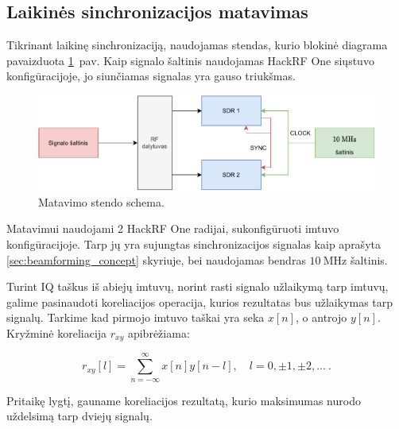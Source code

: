\documentclass[main.tex]{subfiles}
\begin{document}
\subsection{Laikinės sinchronizacijos matavimas}\label{sec:time_sync}

Tikrinant laikinę sinchronizaciją, naudojamas stendas, kurio
blokinė diagrama pavaizduota \ref{fig:measurement_stand}~pav.
Kaip signalo šaltinis naudojamas HackRF One siųstuvo konfigūracijoje,
jo siunčiamas signalas yra gauso triukšmas.

\begin{figure}[h]
    \begin{centering}
    \includegraphics[scale=0.9]{drawings/measurement_stand}
    \par\end{centering}
    \protect\caption{\label{fig:measurement_stand}Matavimo stendo schema.}
\end{figure}

Matavimui naudojami 2 HackRF One radijai, sukonfigūruoti imtuvo konfigūracijoje.
Tarp jų yra sujungtas sinchronizacijos signalas kaip aprašyta \ref{sec:beamforming_concept}
skyriuje, bei naudojamas bendras $10\ \mathrm{MHz}$ šaltinis.

Turint IQ taškus iš abiejų imtuvų, norint rasti signalo užlaikymą tarp imtuvų, galime
pasinaudoti koreliacijos operacija, kurios rezultatas bus užlaikymas tarp signalų.
Tarkime kad pirmojo imtuvo taškai yra seka $x[n]$, o antrojo $y[n]$. Kryžminė
koreliacija $r_{xy}$ apibrėžiama:

\begin{equation}
    r_{xy}[l] = \sum_{n=-\infty}^\infty x[n]y[n-l],\quad l=0,\pm 1, \pm 2,...\ .
    \label{eq:corelation}
\end{equation}

\noindent Pritaikę  lygtį, gauname koreliacijos rezultatą, kurio
maksimumas nurodo uždelsimą tarp dviejų signalų.
\end{document}
